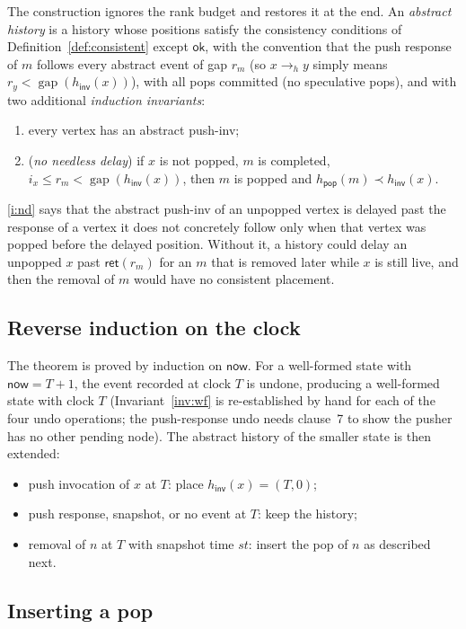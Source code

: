\documentclass[11pt]{article}
\theoremstyle{definition}
\theoremstyle{remark}
\newcommand{\gap}{\mathop{\mathrm{gap}}}
\newcommand{\now}{\mathsf{now}}
\newcommand{\lt}{\prec}
\newcommand{\ret}{\mathsf{ret}}
\newcommand{\pop}{\mathsf{pop}}
\newcommand{\inv}{\mathsf{inv}}
\begin{document}
The construction ignores the rank budget and restores it at the end.  An
\emph{abstract history} is a history whose positions satisfy the
consistency conditions of Definition~\ref{def:consistent} except
\(\mathsf{ok}\), with the convention that the push response of \(m\) follows
every abstract event of gap \(r_m\) (so \(x\to_h y\) simply means
\(r_y<\gap(h_\inv(x))\)), with all pops committed (no speculative pops), and
with two additional \emph{induction invariants}:
\begin{enumerate}[nosep,label=(I\arabic*)]
\item\label{i:tot} every vertex has an abstract push-inv;
\item\label{i:nd} (\emph{no needless delay}) if \(x\) is not popped,
  \(m\) is completed, \(i_x\le r_m<\gap(h_\inv(x))\), then \(m\) is popped
  and \(h_\pop(m)\lt h_\inv(x)\).
\end{enumerate}
\ref{i:nd} says that the abstract push-inv of an unpopped vertex is delayed
past the response of a vertex it does not concretely follow only when that
vertex was popped before the delayed position.  Without it, a history could
delay an unpopped \(x\) past \(\ret(r_m)\) for an \(m\) that is removed
later while \(x\) is still live, and then the removal of \(m\) would have no
consistent placement.

\subsection{Reverse induction on the clock}

The theorem is proved by induction on \(\now\).  For a well-formed state
with \(\now=T+1\), the event recorded at clock \(T\) is undone, producing a
well-formed state with clock \(T\) (Invariant~\ref{inv:wf} is re-established
by hand for each of the four undo operations; the push-response undo needs
clause~7 to show the pusher has no other pending node).  The abstract
history of the smaller state is then extended:
\begin{itemize}[nosep]
\item push invocation of \(x\) at \(T\): place \(h_\inv(x)=(T,0)\);
\item push response, snapshot, or no event at \(T\): keep the history;
\item removal of \(n\) at \(T\) with snapshot time \(st\): insert the pop of
  \(n\) as described next.
\end{itemize}

\subsection{Inserting a pop}
\end{document}
